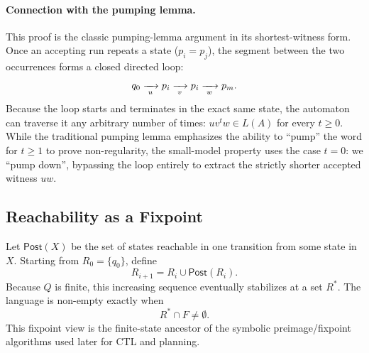 \paragraph{Connection with the pumping lemma.}
This proof is the classic pumping-lemma argument in its shortest-witness form. Once an accepting run repeats a state ($p_i = p_j$), the segment between the two occurrences forms a closed directed loop:
\[
  q_0 \xrightarrow[{\;u\;}]{} p_i
      \xrightarrow[{\;v\;}]{} p_i
      \xrightarrow[{\;w\;}]{} p_m.
\]
Because the loop starts and terminates in the exact same state, the automaton can traverse it any arbitrary number of times: $u v^t w \in L(A)$ for every $t \ge 0$. While the traditional pumping lemma emphasizes the ability to ``pump'' the word for $t \ge 1$ to prove non-regularity, the small-model property uses the case $t = 0$: we ``pump down'', bypassing the loop entirely to extract the strictly shorter accepted witness $uw$.

\subsection{Reachability as a Fixpoint}
\label{subsec:reachability-fixpoint}

Let $\mathsf{Post}(X)$ be the set of states reachable in one transition
from some state in $X$.  Starting from $R_0=\{q_0\}$, define
\[
  R_{i+1}=R_i\cup \mathsf{Post}(R_i).
\]
Because $Q$ is finite, this increasing sequence eventually stabilizes at
a set $R^*$.  The language is non-empty exactly when
\[
  R^*\cap F\neq\emptyset.
\]
This fixpoint view is the finite-state ancestor of the symbolic
preimage/fixpoint algorithms used later for CTL and planning.

